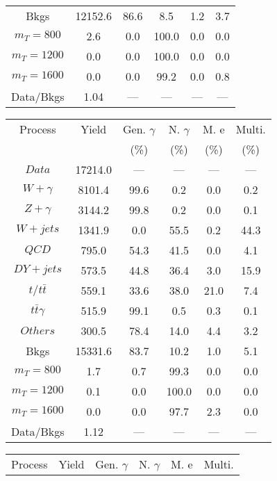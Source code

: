 \begin{figure}
\begin{minipage}[c]{0.32\textwidth}
{\begin{tabular}{cccccc}
Bkgs &  12152.6 &  86.6 &  8.5 &  1.2 &  3.7\\
$ m_{T} = 800 $ &  2.6 &  0.0 &  100.0 &  0.0 &  0.0\\
$ m_{T} = 1200 $ &  0.0 &  0.0 &  100.0 &  0.0 &  0.0\\
$ m_{T} = 1600 $ &  0.0 &  0.0 &  99.2 &  0.0 &  0.8\\
Data/Bkgs &  1.04 &  --- &  --- &  --- &  ---\\
\hline
\end{tabular}
}
\end{minipage}
\begin{minipage}[c]{0.32\textwidth}
\centering
\tiny{
\begin{tabular}{cccccc}
\hline
Process & Yield & Gen. $\gamma$ & N. $\gamma$ & M. e & Multi. \\
 &  & (\%) & (\%) & (\%) & (\%)  \\
\hline
                                                                      $ Data $ &  17214.0 &  --- &  --- &  --- &  ---\\
$ W+\gamma $ &  8101.4 &  99.6 &  0.2 &  0.0 &  0.2\\
$ Z+\gamma $ &  3144.2 &  99.8 &  0.2 &  0.0 &  0.1\\
$ W+jets $ &  1341.9 &  0.0 &  55.5 &  0.2 &  44.3\\
$ QCD $ &  795.0 &  54.3 &  41.5 &  0.0 &  4.1\\
$ DY+jets $ &  573.5 &  44.8 &  36.4 &  3.0 &  15.9\\
$ t/t\bar{t} $ &  559.1 &  33.6 &  38.0 &  21.0 &  7.4\\
$ t\bar{t}\gamma $ &  515.9 &  99.1 &  0.5 &  0.3 &  0.1\\
$ Others $ &  300.5 &  78.4 &  14.0 &  4.4 &  3.2\\
Bkgs &  15331.6 &  83.7 &  10.2 &  1.0 &  5.1\\
$ m_{T} = 800 $ &  1.7 &  0.7 &  99.3 &  0.0 &  0.0\\
$ m_{T} = 1200 $ &  0.1 &  0.0 &  100.0 &  0.0 &  0.0\\
$ m_{T} = 1600 $ &  0.0 &  0.0 &  97.7 &  2.3 &  0.0\\
Data/Bkgs &  1.12 &  --- &  --- &  --- &  ---\\
\hline
\end{tabular}
}
\end{minipage}
\begin{minipage}[c]{0.32\textwidth}
\centering
\tiny{
\begin{tabular}{cccccc}
\hline
Process & Yield & Gen. $\gamma$ & N. $\gamma$ & M. e & Multi. \\

\end{tabular}}
\end{minipage}
\end{figure}
